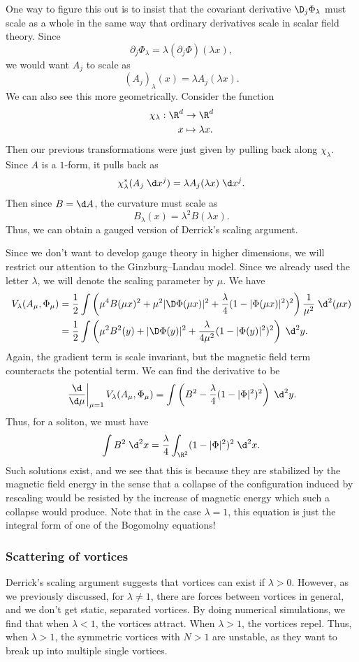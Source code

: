 \documentclass[a4paper]{article}
\begin{document}
One way to figure this out is to insist that the covariant derivative $\D_j \Phi_\lambda$ must scale as a whole in the same way that ordinary derivatives scale in scalar field theory. Since
\[
  \partial_j \Phi_\lambda = \lambda (\partial_j \Phi)(\lambda x),
\]
we would want $A_j$ to scale as
\[
  (A_j)_\lambda(x) = \lambda A_j(\lambda x).
\]
We can also see this more geometrically. Consider the function
\begin{align*}
  \chi_\lambda: \R^d &\to \R^d\\
  x &\mapsto \lambda x.
\end{align*}
Then our previous transformations were just given by pulling back along $\chi_\lambda$. Since $A$ is a $1$-form, it pulls back as
\[
  \chi_\lambda^* (A_j \;\d x^j) = \lambda A_j (\lambda x) \;\d x^j.
\]
Then since $B = \d A$, the curvature must scale as
\[
  B_\lambda(x) = \lambda^2 B(\lambda x).
\]
Thus, we can obtain a gauged version of Derrick's scaling argument.

Since we don't want to develop gauge theory in higher dimensions, we will restrict our attention to the Ginzburg--Landau model. Since we already used the letter $\lambda$, we will denote the scaling parameter by $\mu$. We have
\begin{align*}
  V_\lambda(A_\mu, \Phi_\mu) &= \frac{1}{2} \int \left(\mu^4 B(\mu x)^2 + \mu^2 |\D \Phi(\mu x)|^2 + \frac{\lambda}{4} (1 - |\Phi(\mu x)|^2)^2\right) \frac{1}{\mu^2}\;\d^2 (\mu x)\\
  &= \frac{1}{2} \int \left(\mu^2 B^2(y) + |\D \Phi(y)|^2 + \frac{\lambda}{4 \mu^2} (1 - |\Phi(y)|^2)^2\right)\;\d^2 y.
\end{align*}
Again, the gradient term is scale invariant, but the magnetic field term counteracts the potential term. We can find the derivative to be
\[
  \left.\frac{\d}{\d \mu}\right|_{\mu = 1} V_\lambda(A_\mu, \Phi_\mu) = \int \left(B^2 - \frac{\lambda}{4}(1 - |\Phi|^2)^2\right)\;\d^2 y.
\]
Thus, for a soliton, we must have
\[
  \int B^2\;\d^2 x = \frac{\lambda}{4} \int_{\R^2} (1 - |\Phi|^2)^2 \;\d^2 x.
\]
Such solutions exist, and we see that this is because they are stabilized by the magnetic field energy in the sense that a collapse of the configuration induced by rescaling would be resisted by the increase of magnetic energy which such a collapse would produce. Note that in the case $\lambda = 1$, this equation is just the integral form of one of the Bogomolny equations!


\subsubsection*{Scattering of vortices}
Derrick's scaling argument suggests that vortices can exist if $\lambda > 0$. However, as we previously discussed, for $\lambda \not= 1$, there are forces between vortices in general, and we don't get static, separated vortices. By doing numerical simulations, we find that when $\lambda < 1$, the vortices attract. When $\lambda > 1$, the vortices repel. Thus, when $\lambda > 1$, the symmetric vortices with $N > 1$ are unstable, as they want to break up into multiple single vortices.
\end{document}
